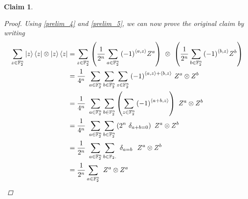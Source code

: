 \message{ !name(report_1.tex)}\documentclass[11pt]{article}
\newtheorem{claim}[thm]{Claim}
\theoremstyle{definition}
\theoremstyle{plain}
\begin{document}
\begin{claim}
\begin{proof}
Using {\ref{prelim_4}} and {\ref{prelim_5}}, we can now prove the original claim by writing
\begin{align}
  \sum\limits_{z \in \mathbb{F}_2^n} \ket{z}\bra{z} \otimes \ket{z}\bra{z}
  &= \sum\limits_{z \in \mathbb{F}_2^n}
    \left( \frac{1}{2^n} \sum\limits_{a \in \mathbb{F}_2^n}
    {(-1)}^{\braket{a,z}} Z^a \right)  \ \otimes \
    \left( \frac{1}{2^n} \sum\limits_{b \in \mathbb{F}_2^n}
    {(-1)}^{\braket{b,z}} Z^b \right) \\
  &= \frac{1}{4^n} \ \sum\limits_{a \in \mathbb{F}_2^n}
    \sum\limits_{b \in \mathbb{F}_2^n} \sum\limits_{z \in \mathbb{F}_2^n}
    {(-1)}^{\braket{a,z} + \braket{b, z}} \ Z^a \otimes Z^b  \\
  &= \frac{1}{4^n} \ \sum\limits_{a \in \mathbb{F}_2^n}
    \sum\limits_{b \in \mathbb{F}_2^n} \left( \sum\limits_{z \in \mathbb{F}_2^n}
    {(-1)}^{\braket{a + b,z}} \right) \ Z^a \otimes Z^b  \\
  &= \frac{1}{4^n} \ \sum\limits_{a \in \mathbb{F}_2^n}
    \sum\limits_{b \in \mathbb{F}_2^n} \left( 2^n \ \delta_{a+b = 0} \right)
    \ Z^a \otimes Z^b  \\
  &= \frac{1}{2^n} \  \sum\limits_{a \in \mathbb{F}_2^n}
    \sum\limits_{b \in \mathbb{F}_2^^n} \ \delta_{a = b} \
    \ Z^a \otimes Z^b \\ 
  &= \frac{1}{2^n} \sum\limits_{a \in \mathbb{F}_2^n} \ Z^a \otimes Z^a
\end{align}
\end{proof}
\end{claim}
\end{document}
